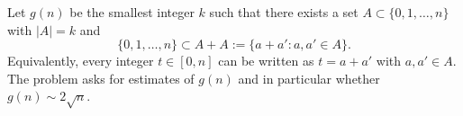 Let $g(n)$ be the smallest integer $k$ such that there exists a set
$A\subset\{0,1,\dots,n\}$ with $|A|=k$ and
\[
\{0,1,\dots,n\} \subset A+A := \{a+a': a,a'\in A\}.
\]
Equivalently, every integer $t\in[0,n]$ can be written as $t=a+a'$ with $a,a'\in A$.
The problem asks for estimates of $g(n)$ and in particular whether $g(n)\sim 2\sqrt n$.
